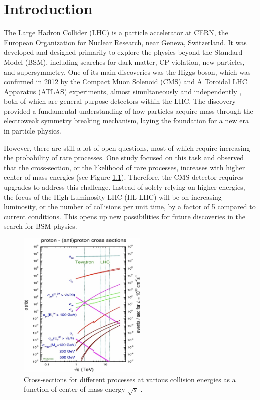 

\chapter{Introduction}
The Large Hadron Collider (LHC) is a particle accelerator at CERN, the European Organization for Nuclear Research, near Geneva, Switzerland. It was developed and designed primarily to explore the physics beyond the Standard Model (BSM), including searches for dark matter, CP violation, new particles, and supersymmetry. \cite{Nath_2010} One of its main discoveries was the Higgs boson, which was confirmed in 2012 by the Compact Muon Solenoid (CMS) and A Toroidal LHC Apparatus (ATLAS) experiments, almost simultaneously and independently \cite{Aad_2012, Chatrchyan_2012}, both of which are general-purpose detectors within the LHC. The discovery provided a fundamental understanding of how particles acquire mass through the electroweak symmetry breaking mechanism, laying the foundation for a new era in particle physics. \cite{Pich_2016}

However, there are still a lot of open questions, most of which require increasing the probability of rare processes. One study focused on this task and observed that the cross-section, or the likelihood of rare processes, increases with higher center-of-mass energies (see Figure \ref{fig:crosssection}). \cite{cartiglia2013measurementprotonprotontotalelastic} Therefore, the CMS detector requires upgrades to address this challenge. Instead of solely relying on higher energies, the focus of the High-Luminosity LHC (HL-LHC) will be on increasing luminosity, or the number of collisions per unit time, by a factor of 5 compared to current conditions. \cite{atlas2019reportphysicshllhcperspectives} This opens up new possibilities for future discoveries in the search for BSM physics.

\begin{figure}[h]
    \centering
    \includegraphics[width=0.55\textwidth]{images/cross-sections.png}
    \caption{Cross-sections for different processes at various collision energies as a function of center-of-mass energy \( \sqrt{s} \) \cite{cartiglia2013measurementprotonprotontotalelastic}.}
    \label{fig:crosssection}
\end{figure}

